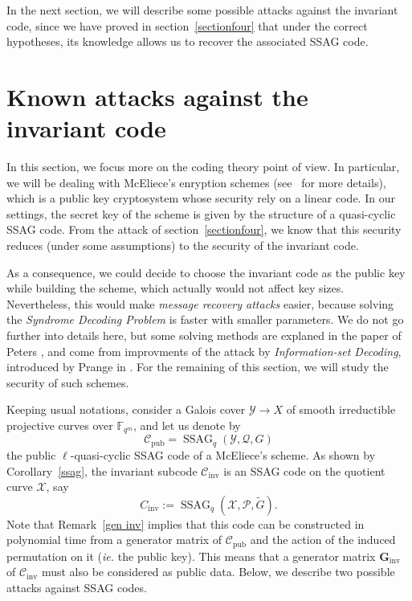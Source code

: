 \documentclass[10pt]{article}
\theoremstyle{definition}
\theoremstyle{definition}
\theoremstyle{definition}
\newcommand{\C}{\mathcal{C}}
\newcommand{\Fqm}{\mathbb{F}_{q^m}}
\newcommand{\X}{\mathcal{X}}
\newcommand{\Y}{\mathcal{Y}}
\newcommand{\PR}{\mathcal{P}}
\newcommand{\QR}{\mathcal{Q}}
\newcommand{\ssag}{\operatorname{SSAG}}
\begin{document}
In the next section, we will describe some possible attacks against the invariant code, since we have proved in section~\ref{sectionfour} that under the correct hypotheses, its knowledge allows us to recover the associated SSAG code.


\section{Known attacks against the invariant code} \label{section6}


In this section, we focus more on the coding theory point of view. In particular, we will be dealing with McEliece's enryption schemes (see~\cite{McE} for more details), which is a public key cryptosystem whose security rely on a linear code. In our settings, the secret key of the scheme is given by the structure of a quasi-cyclic SSAG code. From the attack of section~\ref{sectionfour}, we know that this security reduces (under some assumptions) to the security of the invariant code. 



 As a consequence, we could decide to choose the invariant code as the public key while building the scheme, which actually would not affect key sizes. Nevertheless, this would make \textit{message recovery attacks} easier, because solving the \textit{Syndrome Decoding Problem} is faster with smaller parameters. We do not go further into details here, but some solving methods are explaned in the paper of Peters \cite{PET}, and come from improvments of the attack by \textit{Information-set Decoding}, introduced by Prange in \cite{PR62}. For the remaining of this section, we will study the security of such schemes.



 Keeping usual notations, consider a Galois cover $\Y \longrightarrow X$ of smooth irreductible projective curves over $\Fqm$, and let us denote by 
\[\mathcal{C}_{\mathrm{pub}} = \ssag_q(\Y,\QR,G)\]
the public $\ell$-quasi-cyclic SSAG code of a McEliece's scheme.
As shown by Corollary~\ref{ssag}, the invariant subcode $\mathcal{C}_{\mathrm{inv}}$ is an SSAG code on the quotient curve $\X$, say
\[C_{\mathrm{inv}} := \ssag_q(\X,\PR,\tilde{G}).\]
Note that Remark~\ref{gen inv} implies that this code can be constructed in polynomial time from a generator matrix of $\mathcal{C}_{\mathrm{pub}}$ and the action of the induced permutation on it (\textit{ie.} the public key). This means that a generator matrix $\mathbf{G}_{\mathrm{inv}}$ of $\C_{\mathrm{inv}}$ must also be considered as public data. Below, we describe two possible attacks against SSAG codes. 
\end{document}
